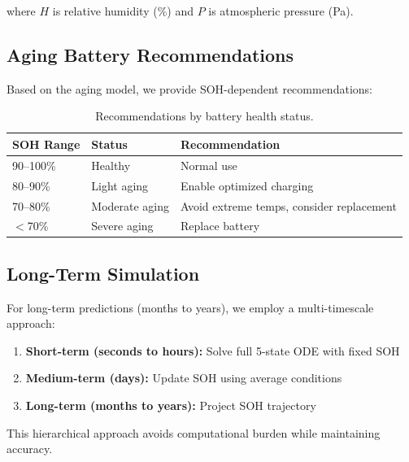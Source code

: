 where $H$ is relative humidity (\%) and $P$ is atmospheric pressure (Pa).

\subsection{Aging Battery Recommendations}
\label{subsec:aging_recommendations}

Based on the aging model, we provide SOH-dependent recommendations:

\begin{table}[H]
    \centering
    \caption{Recommendations by battery health status.}
    \label{tab:soh_recommendations}
    \begin{tabular}{lll}
        \toprule
        \textbf{SOH Range} & \textbf{Status} & \textbf{Recommendation} \\
        \midrule
        90--100\% & Healthy & Normal use \\
        80--90\% & Light aging & Enable optimized charging \\
        70--80\% & Moderate aging & Avoid extreme temps, consider replacement \\
        $<$70\% & Severe aging & Replace battery \\
        \bottomrule
    \end{tabular}
\end{table}

\subsection{Long-Term Simulation}
\label{subsec:long_term}

For long-term predictions (months to years), we employ a multi-timescale approach:

\begin{enumerate}
    \item \textbf{Short-term (seconds to hours):} Solve full 5-state ODE with fixed SOH
    \item \textbf{Medium-term (days):} Update SOH using average conditions
    \item \textbf{Long-term (months to years):} Project SOH trajectory
\end{enumerate}

This hierarchical approach avoids computational burden while maintaining accuracy.
